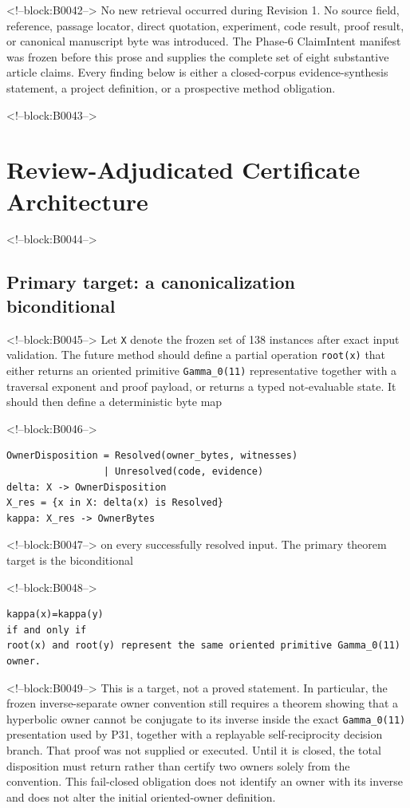 \documentclass[11pt]{article}
\begin{document}
<!--block:B0042-->
No new retrieval occurred during Revision 1. No source field, reference,
passage locator, direct quotation, experiment, code result, proof
result, or canonical manuscript byte was introduced. The Phase-6
ClaimIntent manifest was frozen before this prose and supplies the
complete set of eight substantive article claims. Every finding below is
either a closed-corpus evidence-synthesis statement, a project
definition, or a prospective method obligation.

<!--block:B0043-->
\hypertarget{4-review-adjudicated-certificate-architecture}{%
\section{Review-Adjudicated Certificate
Architecture}\label{4-review-adjudicated-certificate-architecture}}

<!--block:B0044-->
\hypertarget{41-primary-target-a-canonicalization-biconditional}{%
\subsection{Primary target: a canonicalization
biconditional}\label{41-primary-target-a-canonicalization-biconditional}}

<!--block:B0045-->
Let \texttt{X} denote the frozen set of 138 instances after exact input
validation. The future method should define a partial operation
\texttt{root(x)} that either returns an oriented primitive
\texttt{Gamma\_0(11)} representative together with a traversal exponent
and proof payload, or returns a typed not-evaluable state. It should
then define a deterministic byte map

<!--block:B0046-->
\begin{verbatim}
OwnerDisposition = Resolved(owner_bytes, witnesses)
                 | Unresolved(code, evidence)
delta: X -> OwnerDisposition
X_res = {x in X: delta(x) is Resolved}
kappa: X_res -> OwnerBytes
\end{verbatim}

<!--block:B0047-->
on every successfully resolved input. The primary theorem target is the
biconditional

<!--block:B0048-->
\begin{verbatim}
kappa(x)=kappa(y)
if and only if
root(x) and root(y) represent the same oriented primitive Gamma_0(11) owner.
\end{verbatim}

<!--block:B0049-->
This is a target, not a proved statement. In particular, the frozen
inverse-separate owner convention still requires a theorem showing that a
hyperbolic owner cannot be conjugate to its inverse inside the exact
\texttt{Gamma\_0(11)} presentation used by P31, together with a replayable
self-reciprocity decision branch. That proof was not supplied or executed.
Until it is closed, the total disposition must return
 rather than certify two owners solely from
the convention. This fail-closed obligation does not identify an owner with
its inverse and does not alter the initial oriented-owner definition.
\end{document}

